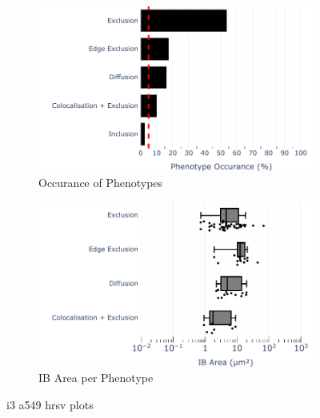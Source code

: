 \begin{figure}
    \begin{subfigure}{0.5\textwidth}
        \includegraphics[width=1\linewidth]{09. Chapter 4/Figs/02. Infection/02. IFIT3/01. bar_i3_a549.pdf} 
        \caption[]{Occurance of Phenotypes}
    \end{subfigure}
    \begin{subfigure}{0.5\textwidth}
        \includegraphics[width=1\linewidth]{09. Chapter 4/Figs/02. Infection/02. IFIT3/02. box_i3_a549.pdf}
        \caption[]{IB Area per Phenotype}
    \end{subfigure}
    \caption[i3 a549 hrsv plots]{i3 a549 hrsv plots}
    \label{fig:i3 a549 hrsv plots}
\end{figure}

